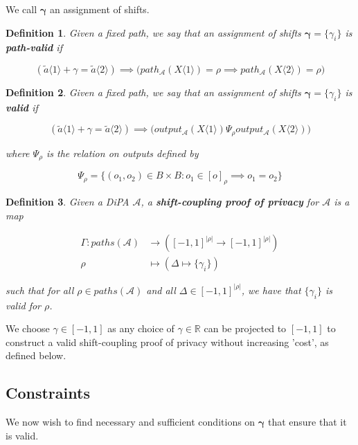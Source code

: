 \documentclass{article}
\newcommand{\R}{\mathbb{R}}
\newtheorem{definition}{Definition}[section]
\newcommand{\1}{\langle 1 \rangle}
\newcommand{\2}{\langle 2 \rangle}
\begin{document}
We call $\boldsymbol{\gamma}$ an assignment of shifts.

\begin{definition}
    
    Given a fixed path, we say that an assignment of shifts $\boldsymbol{\gamma} = \{\gamma_i\}$ is \textbf{path-valid} if
    
    \[(\tilde{a} \1 + \gamma = \tilde{a} \2) \implies \big(path_{\mathcal{A}}(X \1) = \rho \implies path_{\mathcal{A}}(X \2) = \rho \big)\]
    
    \end{definition}
    
    \begin{definition}
        Given a fixed path, we say that an assignment of shifts $\boldsymbol{\gamma} = \{\gamma_i\}$ is \textbf{valid} if
    
        \[(\tilde{a} \1 + \gamma = \tilde{a} \2) \implies \big(output_{\mathcal{A}}(X \1) \Psi_\rho output_{\mathcal{A}}(X \2) \big)\]
    
        where $\Psi_\rho$ is the relation on outputs defined by
    
        \[\Psi_\rho = \{(o_1, o_2) \in B \times B : o_1 \in [o]_\rho \implies o_1 = o_2\}\]
    \end{definition}


    \begin{definition}
        Given a DiPA $\mathcal{A}$, a \textbf{shift-coupling proof of privacy} for $\mathcal{A}$ is a map 
    
        \begin{align*}
            \Gamma: paths(\mathcal{A}) &\to ([-1, 1]^{|\rho|} \to [-1, 1]^{|\rho|})\\
            \rho &\mapsto (\Delta \mapsto \{\gamma_i\})
        \end{align*}
    
        such that for all $\rho \in paths(\mathcal{A})$ and all $\Delta \in [-1, 1]^{|\rho|}$, we have that $\{\gamma_i\}$ is valid for $\rho$.
    \end{definition}

    We choose $\gamma \in [-1, 1]$ as any choice of $\gamma \in \R$ can be projected to $[-1, 1]$ to construct a valid shift-coupling proof of privacy without increasing 'cost', as defined below.

\subsection{Constraints} 
We now wish to find necessary and sufficient conditions on $\boldsymbol{\gamma}$ that ensure that it is valid.
\end{document}
